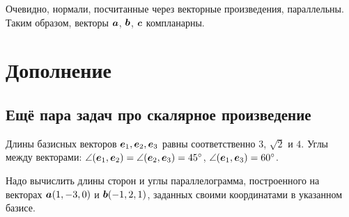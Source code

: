 \documentclass[a4paper,12pt]{article}
\begin{document}
\begin{solution}
    Очевидно, нормали, посчитанные через векторные произведения, параллельны.
    Таким образом, векторы $\boldsymbol a$, $\boldsymbol b$, $\boldsymbol c$ компланарны.
  \end{solution}
  
  
  \section{Дополнение}
  
  \subsection{Ещё пара задач про скалярное произведение}
  
  \begin{problem}
    Длины базисных векторов $\boldsymbol e_1, \boldsymbol e_2, \boldsymbol e_3$ равны соответственно $3$, $\sqrt{2}$ и $4$.
    Углы между векторами: $\angle (\bds e_1, \bds e_2) \hm= \angle (\bds e_2, \bds e_3) \hm= 45\degree$, $\angle (\bds e_1, \bds e_3) \hm= 60\degree$.
    
    Надо вычислить длины сторон и углы параллелограмма, построенного на векторах $\boldsymbol a (1, -3, 0)$ и $\boldsymbol b (-1, 2, 1)$, заданных своими координатами в указанном базисе.
  \end{problem}
  
\end{document}
